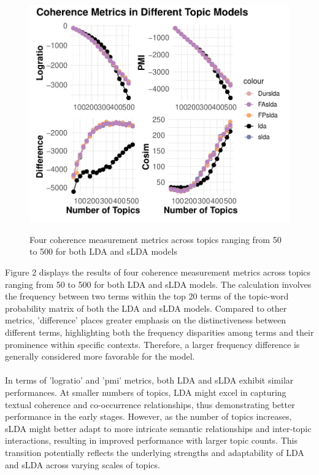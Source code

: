 \documentclass[12pt,twoside]{article}
\begin{document}
\begin{figure}[h]
    \centering
    \includegraphics[width=15cm]{./figures/Coherence}\\[0.2cm] 
    \caption{Four coherence measurement metrics across topics ranging from 50 to 500 for both LDA and sLDA models}

\end{figure}

Figure 2 displays the results of four coherence measurement metrics across topics ranging from 50 to 500 for both LDA and sLDA models. The calculation involves the frequency between two terms within the top 20 terms of the topic-word probability matrix of both the LDA and sLDA models. Compared to other metrics, 'difference' places greater emphasis on the distinctiveness between different terms, highlighting both the frequency disparities among terms and their prominence within specific contexts. Therefore, a larger frequency difference is generally considered more favorable for the model.\\\\

In terms of 'logratio' and 'pmi' metrics, both LDA and sLDA exhibit similar performances. At smaller numbers of topics, LDA might excel in capturing textual coherence and co-occurrence relationships, thus demonstrating better performance in the early stages. However, as the number of topics increases, sLDA might better adapt to more intricate semantic relationships and inter-topic interactions, resulting in improved performance with larger topic counts. This transition potentially reflects the underlying strengths and adaptability of LDA and sLDA across varying scales of topics.\\\\
\end{document}
